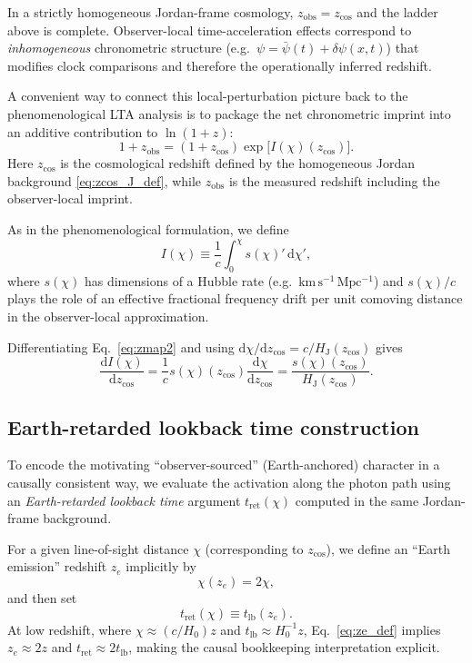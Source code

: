 \documentclass[10pt]{article}
\newcommand{\zobs}{z_{\mathrm{obs}}}
\newcommand{\zcos}{z_{\mathrm{cos}}}
\newcommand{\chis}{\chi}
\newcommand{\kmsMpc}{\mathrm{km\,s^{-1}\,Mpc^{-1}}}
\newcommand{\Iofchi}{I(\chis)}
\newcommand{\sofchi}{s(\chis)}
\newcommand{\tret}{t_{\mathrm{ret}}}
\newcommand{\tlb}{t_{\mathrm{lb}}}
\providecommand{\dd}{\mathrm{d}}
\newcommand{\HJ}{H_{\mathrm{J}}}
\begin{document}
In a strictly homogeneous Jordan-frame cosmology, $\zobs=\zcos$ and the ladder above is complete.
Observer-local time-acceleration effects correspond to \emph{inhomogeneous} chronometric structure
(e.g.\ $\psi=\bar\psi(t)+\delta\psi(x,t)$) that modifies clock comparisons and therefore the
operationally inferred redshift.

A convenient way to connect this local-perturbation picture back to the phenomenological LTA
analysis is to package the net chronometric imprint into an additive contribution to $\ln(1+z)$:
\begin{equation}
1+\zobs = (1+\zcos)\exp\!\bigl[\Iofchi(\zcos)\bigr].
\label{eq:zmap2}
\end{equation}
Here $\zcos$ is the cosmological redshift defined by the homogeneous Jordan background
\eqref{eq:zcos_J_def}, while $\zobs$ is the measured redshift including the observer-local imprint.

As in the phenomenological formulation, we define
\begin{equation}
\Iofchi \equiv \frac{1}{c}\int_{0}^{\chis} \sofchi' \,\dd \chis',
\label{eq:I_def2}
\end{equation}
where $\sofchi$ has dimensions of a Hubble rate (e.g.\ $\kmsMpc$) and $\sofchi/c$ plays the role of an
effective fractional frequency drift per unit comoving distance in the observer-local approximation.

Differentiating Eq.~\eqref{eq:zmap2} and using $\dd\chis/\dd\zcos = c/\HJ(\zcos)$ gives
\begin{equation}
\frac{\dd \Iofchi}{\dd \zcos}
= \frac{1}{c}\sofchi(\zcos)\frac{\dd \chis}{\dd \zcos}
= \frac{\sofchi(\zcos)}{\HJ(\zcos)}.
\label{eq:dIdz}
\end{equation}

\subsection{Earth-retarded lookback time construction}
\label{sec:tret2}

To encode the motivating ``observer-sourced'' (Earth-anchored) character in a causally consistent
way, we evaluate the activation along the photon path using an \emph{Earth-retarded lookback time}
argument $\tret(\chis)$ computed in the same Jordan-frame background.

For a given line-of-sight distance $\chis$ (corresponding to $\zcos$), we define an ``Earth emission''
redshift $z_e$ implicitly by
\begin{equation}
\chis(z_e) = 2\chis,
\label{eq:ze_def}
\end{equation}
and then set
\begin{equation}
\tret(\chis) \equiv \tlb(z_e).
\label{eq:tret_def}
\end{equation}
At low redshift, where $\chis\approx (c/H_0)z$ and $\tlb\approx H_0^{-1}z$, Eq.~\eqref{eq:ze_def}
implies $z_e\approx 2z$ and $\tret\approx 2\tlb$, making the causal bookkeeping interpretation explicit.
\end{document}
